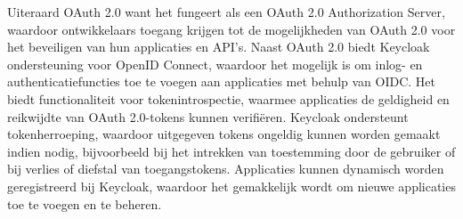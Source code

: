Uiteraard OAuth 2.0 want het fungeert als een OAuth 2.0 Authorization Server, waardoor ontwikkelaars toegang krijgen tot de mogelijkheden van OAuth 2.0 voor het beveiligen van hun applicaties en API's.
Naast OAuth 2.0 biedt Keycloak ondersteuning voor OpenID Connect, waardoor het mogelijk is om inlog- en authenticatiefuncties toe te voegen aan applicaties met behulp van OIDC.
Het biedt functionaliteit voor tokenintrospectie, waarmee applicaties de geldigheid en reikwijdte van OAuth 2.0-tokens kunnen verifiëren.
Keycloak ondersteunt tokenherroeping, waardoor uitgegeven tokens ongeldig kunnen worden gemaakt indien nodig, bijvoorbeeld bij het intrekken van toestemming door de gebruiker of bij verlies of diefstal van toegangstokens.
Applicaties kunnen dynamisch worden geregistreerd bij Keycloak, waardoor het gemakkelijk wordt om nieuwe applicaties toe te voegen en te beheren.
